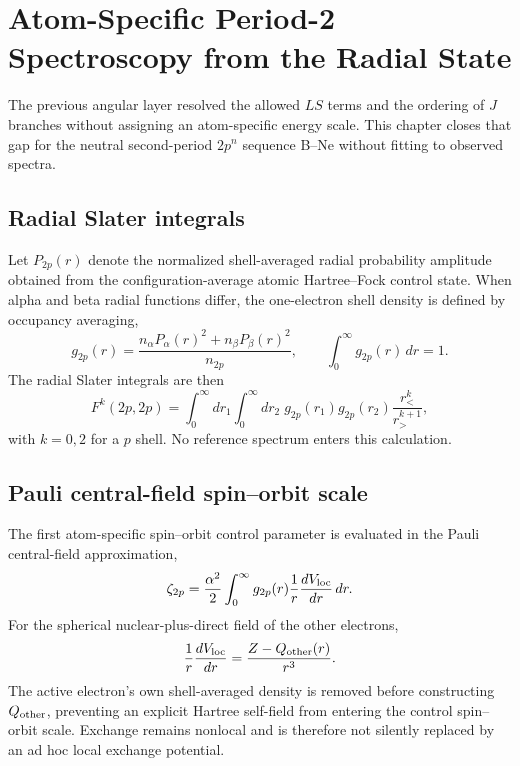 \section{Atom-Specific Period-2 Spectroscopy from the Radial State}
\label{sec:period2_atom_specific_spectroscopy}

The previous angular layer resolved the allowed $LS$ terms and the ordering of $J$ branches without assigning an atom-specific energy scale.  This chapter closes that gap for the neutral second-period $2p^n$ sequence B--Ne without fitting to observed spectra.

\subsection{Radial Slater integrals}

Let $P_{2p}(r)$ denote the normalized shell-averaged radial probability amplitude obtained from the configuration-average atomic Hartree--Fock control state.  When alpha and beta radial functions differ, the one-electron shell density is defined by occupancy averaging,
\begin{equation}
 g_{2p}(r)=\frac{n_\alpha P_\alpha(r)^2+n_\beta P_\beta(r)^2}{n_{2p}},
 \qquad \int_0^\infty g_{2p}(r)\,dr=1.
\end{equation}
The radial Slater integrals are then
\begin{equation}
 F^k(2p,2p)=\int_0^\infty\!dr_1\int_0^\infty\!dr_2\;
 g_{2p}(r_1)g_{2p}(r_2)\frac{r_<^k}{r_>^{k+1}},
\end{equation}
with $k=0,2$ for a $p$ shell.  No reference spectrum enters this calculation.

\subsection{Pauli central-field spin--orbit scale}

The first atom-specific spin--orbit control parameter is evaluated in the Pauli central-field approximation,
\begin{equation}
 \zeta_{2p}=\frac{\alpha^2}{2}\int_0^\infty g_{2p}(r)
 \frac{1}{r}\frac{dV_{\rm loc}}{dr}\,dr.
\end{equation}
For the spherical nuclear-plus-direct field of the other electrons,
\begin{equation}
 \frac{1}{r}\frac{dV_{\rm loc}}{dr}=\frac{Z-Q_{\rm other}(r)}{r^3}.
\end{equation}
The active electron's own shell-averaged density is removed before constructing $Q_{\rm other}$, preventing an explicit Hartree self-field from entering the control spin--orbit scale.  Exchange remains nonlocal and is therefore not silently replaced by an ad hoc local exchange potential.

